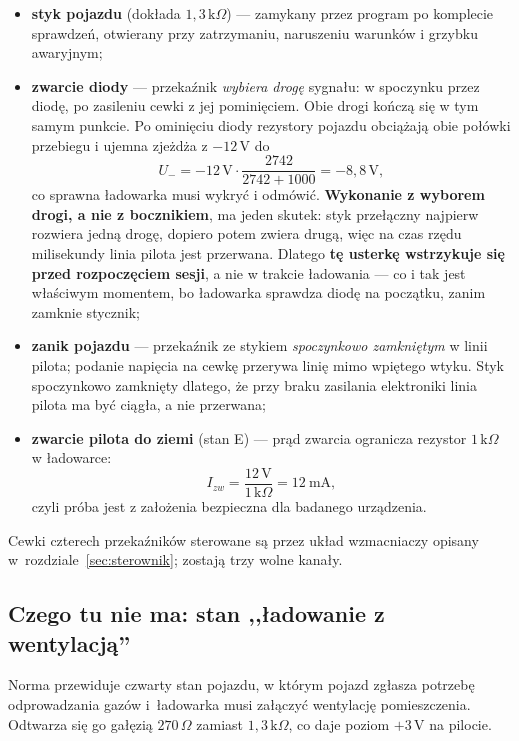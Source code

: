 \documentclass[a4paper,11pt]{article}
\newcommand{\ohm}{\,\Omega}
\newcommand{\kohm}{\,\mathrm{k}\Omega}
\newcommand{\volt}{\,\mathrm{V}}
\begin{document}
\begin{itemize}
\item \textbf{styk pojazdu} (dokłada $1{,}3\kohm$) --- zamykany przez program po
      komplecie sprawdzeń, otwierany przy zatrzymaniu, naruszeniu warunków
      i grzybku awaryjnym;
\item \textbf{zwarcie diody} --- przekaźnik \emph{wybiera drogę} sygnału: w spoczynku
      przez diodę, po zasileniu cewki z jej pominięciem. Obie drogi kończą się w tym
      samym punkcie. Po ominięciu diody rezystory pojazdu obciążają obie połówki
      przebiegu i ujemna zjeżdża z $-12\volt$ do
      \[
      U_{-}=-12\volt\cdot\frac{2742}{2742+1000}=-8{,}8\volt,
      \]
      co sprawna ładowarka musi wykryć i odmówić. \textbf{Wykonanie z wyborem drogi,
      a nie z bocznikiem}, ma jeden skutek: styk przełączny najpierw rozwiera jedną
      drogę, dopiero potem zwiera drugą, więc na czas rzędu milisekundy linia pilota
      jest przerwana. Dlatego \textbf{tę usterkę wstrzykuje się przed rozpoczęciem
      sesji}, a nie w trakcie ładowania --- co i tak jest właściwym momentem, bo
      ładowarka sprawdza diodę na początku, zanim zamknie stycznik;
\item \textbf{zanik pojazdu} --- przekaźnik ze stykiem \emph{spoczynkowo zamkniętym}
      w linii pilota; podanie napięcia na cewkę przerywa linię mimo wpiętego wtyku.
      Styk spoczynkowo zamknięty dlatego, że przy braku zasilania elektroniki linia
      pilota ma być ciągła, a nie przerwana;
\item \textbf{zwarcie pilota do ziemi} (stan E) --- prąd zwarcia ogranicza rezystor
      $1\kohm$ w ładowarce:
      \[
      I_{zw}=\frac{12\volt}{1\kohm}=12\ \mathrm{mA},
      \]
      czyli próba jest z założenia bezpieczna dla badanego urządzenia.
\end{itemize}

Cewki czterech przekaźników sterowane są przez układ wzmacniaczy opisany
w~rozdziale~\ref{sec:sterownik}; zostają trzy wolne kanały.

\subsection{Czego tu nie ma: stan ,,ładowanie z wentylacją''}
\label{sec:bezD}

Norma przewiduje czwarty stan pojazdu, w którym pojazd zgłasza potrzebę odprowadzania
gazów i~ładowarka musi załączyć wentylację pomieszczenia. Odtwarza się go gałęzią
$270\ohm$ zamiast $1{,}3\kohm$, co daje poziom $+3\volt$ na pilocie.
\end{document}
